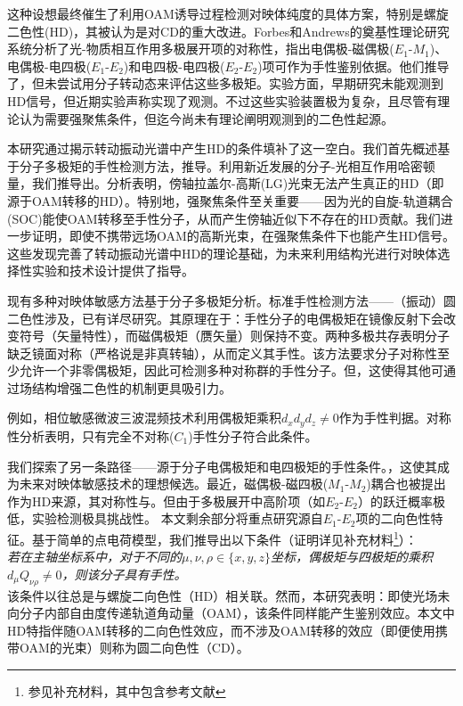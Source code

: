 \documentclass[reprint,aps,prl,twocolumn,superscriptaddress,groupedaddress]{revtex4-2}
\newcommand{\eomo}{$E_1$-$M_1$}
\newcommand{\eoet}{$E_1$-$E_2$}
\newcommand{\etet}{$E_2$-$E_2$}
\begin{document}
这种设想最终催生了利用OAM诱导过程检测对映体纯度的具体方案，特别是螺旋二色性(HD)\cite{ANDREWS2004,Ye2019,Li2021}，其被认为是对CD的重大改进\cite{Ye2019,Li2021}。Forbes和Andrews的奠基性理论研究\cite{Forbes2018,Forbes2019,Forbes2021}系统分析了光-物质相互作用多极展开项的对称性，指出电偶极-磁偶极(\eomo)、电偶极-电四极(\eoet)和电四极-电四极(\etet)项可作为手性鉴别依据。他们推导了，但未尝试用分子转动态来评估这些多极矩。实验方面，早期研究未能观测到HD信号\cite{Araoka2005,Loeffler2011}，但近期实验声称实现了观测\cite{Rusak2019,Zhang2020,Rouxel2022,Begin2023,Jain2023}。不过这些实验装置极为复杂，且尽管有理论认为需要强聚焦条件\cite{Forbes2019}，但迄今尚未有理论阐明观测到的二色性起源。

本研究通过揭示转动振动光谱中产生HD的条件填补了这一空白。我们首先概述基于分子多极矩的手性检测方法，推导。利用新近发展的分子-光相互作用哈密顿量\cite{Maslov2024,Maslov_Thesis}，我们推导出。分析表明，傍轴拉盖尔-高斯(LG)光束无法产生真正的HD（即源于OAM转移的HD）。特别地，强聚焦条件至关重要——因为光的自旋-轨道耦合(SOC)\cite{Bliokh2015}能使OAM转移至手性分子，从而产生傍轴近似下不存在的HD贡献。我们进一步证明，即使不携带远场OAM的高斯光束，在强聚焦条件下也能产生HD信号。这些发现完善了转动振动光谱中HD的理论基础，为未来利用结构光进行对映体选择性实验和技术设计提供了指导。

现有多种对映体敏感方法基于分子多极矩分析。标准手性检测方法——（振动）圆二色性涉及，已有详尽研究\cite{Stephens1985,BUCKINGHAM1987,Mun2019,Lovesey2019}。其原理在于：手性分子的电偶极矩在镜像反射下会改变符号（矢量特性），而磁偶极矩（赝矢量）则保持不变。两种多极共存表明分子缺乏镜面对称（严格说是非真转轴），从而定义其手性。该方法要求分子对称性至少允许一个非零偶极矩，因此可检测多种对称群的手性分子。但，这使得其他可通过场结构增强二色性的机制更具吸引力。

例如，相位敏感微波三波混频技术\cite{Patterson2013,Patterson2013PRL}利用偶极矩乘积$d_xd_yd_z\neq 0$作为手性判据\cite{Patterson2013,Ordonez2018,Ayuso2022}。对称性分析表明，只有完全不对称($C_1$)手性分子符合此条件。

我们探索了另一条路径——源于分子电偶极矩和电四极矩的手性条件。，这使其成为未来对映体敏感技术的理想候选。最近，磁偶极-磁四极($M_1$-$M_2$)耦合也被提出作为HD来源，其对称性与\cite{Ji2024}。但由于多极展开中高阶项（如\etet）的跃迁概率极低，实验检测极具挑战性。
本文剩余部分将重点研究源自\eoet 项的二向色性特征。基于简单的点电荷模型，我们推导出以下条件（证明详见补充材料\footnote{参见补充材料，其中包含参考文献\cite{Maslov2024,Maslov_Thesis,Lax1975,Bliokh2015,Bliokh2023}}）：\\
\textit{若在主轴坐标系中，对于不同的$\mu, \nu, \rho \in \{x,y,z\}$坐标，偶极矩与四极矩的乘积$d_{\mu}Q_{\nu \rho} \neq 0$，则该分子具有手性。}\\
该条件以往总是与螺旋二向色性（HD）相关联\cite{ANDREWS2004,Forbes2018}。然而，本研究表明：即使光场未向分子内部自由度传递轨道角动量（OAM），该条件同样能产生鉴别效应。本文中HD特指伴随OAM转移的二向色性效应，而不涉及OAM转移的效应（即便使用携带OAM的光束）则称为圆二向色性（CD）。
\end{document}
